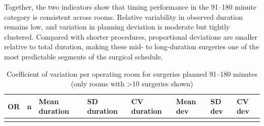 \documentclass[
]{article}
\begin{document}
Together, the two indicators show that timing performance in the 91--180
minute category is consistent across rooms. Relative variability in
observed duration remains low, and variation in planning deviation is
moderate but tightly clustered. Compared with shorter procedures,
proportional deviations are smaller relative to total duration, making
these mid- to long-duration surgeries one of the most predictable
segments of the surgical schedule.

\begin{longtable}[]{@{}
  >{\centering\arraybackslash}p{}
  >{\centering\arraybackslash}p{}
  >{\centering\arraybackslash}p{}
  >{\centering\arraybackslash}p{}
  >{\centering\arraybackslash}p{}
  >{\centering\arraybackslash}p{}
  >{\centering\arraybackslash}p{}
  >{\centering\arraybackslash}p{}@{}}
\caption{Coefficient of variation per operating room for surgeries
planned 91--180 minutes (only rooms with \textgreater10 surgeries shown)
\label{tab:cv_room_91_180}}\tabularnewline
\toprule\noalign{}
\begin{minipage}[b]{\linewidth}\centering
OR
\end{minipage} & \begin{minipage}[b]{\linewidth}\centering
n
\end{minipage} & \begin{minipage}[b]{\linewidth}\centering
Mean duration
\end{minipage} & \begin{minipage}[b]{\linewidth}\centering
SD duration
\end{minipage} & \begin{minipage}[b]{\linewidth}\centering
CV duration
\end{minipage} & \begin{minipage}[b]{\linewidth}\centering
Mean dev
\end{minipage} & \begin{minipage}[b]{\linewidth}\centering
SD dev
\end{minipage} & \begin{minipage}[b]{\linewidth}\centering
CV dev
\end{minipage} \\
\midrule\noalign{}

\end{longtable}
\end{document}
